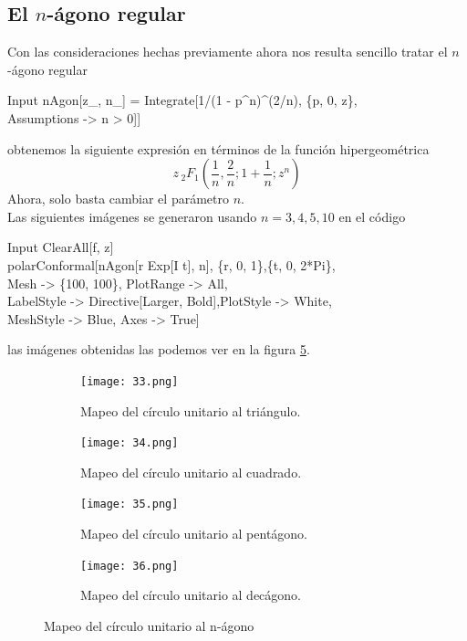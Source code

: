 \subsection{El $n$-ágono regular}
Con las consideraciones hechas previamente ahora nos resulta sencillo tratar el $n$-ágono regular
\begin{mmaCell}{Input}
	 nAgon[z_, n_] = Integrate[1/(1 - p^n)^(2/n), \{p, 0, z\},\\Assumptions -> n > 0]]
\end{mmaCell} 
obtenemos la siguiente expresión en términos de la función hipergeométrica
$$z \, _2F_1\left(\frac{1}{n},\frac{2}{n};1+\frac{1}{n};z^n\right)$$
Ahora, solo basta cambiar el parámetro $n$.\\
Las siguientes imágenes se generaron usando $n=3,4,5,10$ en el código
\begin{mmaCell}{Input}
	 ClearAll[f, z]\\polarConformal[nAgon[r Exp[I t], n], \{r, 0, 1\},\{t, 0, 2*Pi\},\\Mesh -> \{100, 100\}, PlotRange -> All,\\LabelStyle -> Directive[Larger, Bold],PlotStyle -> White,\\MeshStyle -> Blue, Axes -> True]
\end{mmaCell}
las imágenes obtenidas las podemos ver en la figura \ref{fig:Mapeo del círculo unitario al n-ágono}. \newpage
\begin{figure}[htbp]
	\centering
	\begin{subfigure}{0.45\textwidth}
		\texttt{[image: 33.png]}
		\caption{Mapeo del círculo unitario al triángulo.}
		\label{fig:Mapeo del círculo unitario al triángulo.}
	\end{subfigure}
	\begin{subfigure}{0.45\textwidth}
		\texttt{[image: 34.png]}
		\caption{Mapeo del círculo unitario al cuadrado.}
		\label{fig:Mapeo del círculo unitario al cuadrado}
	\end{subfigure}
	
	\begin{subfigure}{0.45\textwidth}
		\texttt{[image: 35.png]}
		\caption{Mapeo del círculo unitario al pentágono.}
		\label{fig:Mapeo del círculo unitario al pentágono}
	\end{subfigure}
	\begin{subfigure}{0.45\textwidth}
		\texttt{[image: 36.png]}
		\caption{Mapeo del círculo unitario al decágono.}
		\label{fig:Mapeo del círculo unitario al decágono}
	\end{subfigure}
	\caption{Mapeo del círculo unitario al n-ágono}
	\label{fig:Mapeo del círculo unitario al n-ágono}
\end{figure}

